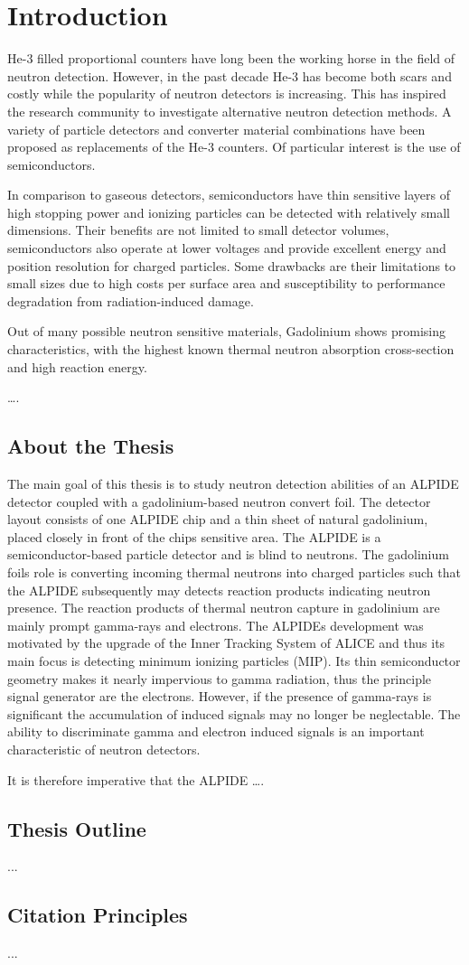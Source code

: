 \chapter{Introduction}
\label{chap:Intro}
He-3 filled proportional counters have long been the working horse in the field of neutron detection. However, in the past decade He-3 has become both scars and costly while the popularity of neutron detectors is increasing. This has inspired the research community to investigate alternative neutron detection methods. A variety of particle detectors and converter material combinations have been proposed as replacements of the He-3 counters. Of particular interest is the use of semiconductors.

In comparison to gaseous detectors, semiconductors have thin sensitive layers of high stopping power and ionizing particles can be detected with relatively small dimensions.
Their benefits are not limited to small detector volumes, semiconductors also operate at lower voltages and provide excellent energy and position resolution for charged particles. Some drawbacks are their limitations to small sizes due to high costs per surface area and susceptibility to performance degradation from radiation-induced damage.

Out of many possible neutron sensitive materials, Gadolinium shows promising characteristics, with the highest known thermal neutron absorption cross-section and high reaction energy.

….

\section{About the Thesis}
The main goal of this thesis is to study neutron detection abilities of an ALPIDE detector coupled with a gadolinium-based neutron convert foil. The detector layout consists of one ALPIDE chip and a thin sheet of natural gadolinium, placed closely in front of the chips sensitive area. The ALPIDE is a semiconductor-based particle detector and is blind to neutrons. The gadolinium foils role is converting incoming thermal neutrons into charged particles such that the ALPIDE subsequently may detects reaction products indicating neutron presence. The reaction products of thermal neutron capture in gadolinium are mainly prompt gamma-rays and electrons. The ALPIDEs development was motivated by the upgrade of the Inner Tracking System of ALICE and thus its main focus is detecting minimum ionizing particles (MIP). Its thin semiconductor geometry makes it nearly impervious to gamma radiation, thus the principle signal generator are the electrons. However, if the presence of gamma-rays is significant the accumulation of induced signals may no longer be neglectable. The ability to discriminate gamma and electron induced signals is an important characteristic of neutron detectors.

It is therefore imperative that the ALPIDE ….

\section{Thesis Outline}
...
\section{Citation Principles}
...
